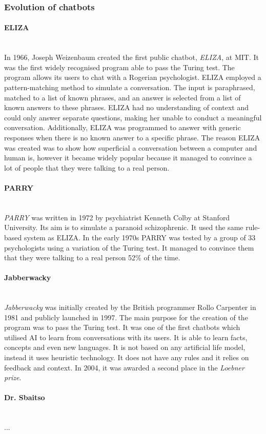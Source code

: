 \documentclass[12pt,a4paper]{article}
\newcommand{\myparagraph}[1]{\paragraph{#1}\mbox{}\\}
\begin{document}
\subsubsection{Evolution of chatbots}
\myparagraph{ELIZA}
In 1966, Joseph Weizenbaum created the first public chatbot, \textit{ELIZA}, at MIT. It was the first widely recognised program able to pass the Turing test. The program allows its users to chat with a Rogerian psychologist. ELIZA employed a pattern-matching method to simulate a conversation. The input is paraphrased, matched to a list of known phrases, and an answer is selected from a list of known answers to these phrases. ELIZA had no understanding of context and could only answer separate questions, making her unable to conduct a meaningful conversation. Additionally, ELIZA was programmed to answer with generic responses when there is no known answer to a specific phrase.
The reason ELIZA was created was to show how superficial a conversation between a computer and human is, however it became widely popular because it managed to convince a lot of people that they were talking to a real person.

\myparagraph{PARRY}
\textit{PARRY} was written in 1972 by psychiatrist Kenneth Colby at Stanford University. Its aim is to simulate a paranoid schizophrenic. It used the same rule-based system as ELIZA. In the early 1970s PARRY was tested by a group of 33 psychologists using a variation of the Turing test. It managed to convince them that they were talking to a real person 52\% of the time.

\myparagraph{Jabberwacky}
\textit{Jabberwacky} was initially created by the British programmer Rollo Carpenter in 1981 and publicly launched in 1997. The main purpose for the creation of the program was to pass the Turing test. It was one of the first chatbots which utilised AI to learn from conversations with its users. It is able to learn facts, concepts and even new languages. It is not based on any artificial life model, instead it uses heuristic technology. It does not have any rules and it relies on feedback and context. In 2004, it was awarded a second place in the \textit{Loebner prize}.

\myparagraph{Dr. Sbaitso}
...
\end{document}
